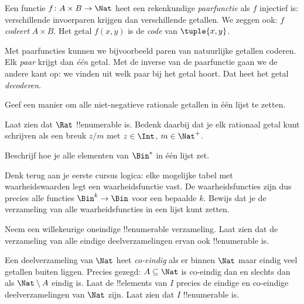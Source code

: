 \documentclass[openany]{memoir}
\begin{document}
\begin{defn}[Paarfunctie]
  Een functie $f\colon A \times B \to \Nat$ heet een rekenkundige
  \emph{paarfunctie} als $f$ injectief is: verschillende invoerparen
  krijgen dan verschillende getallen. We zeggen ook: $f$
  \emph{codeert} $A \times B$. Het getal $f(x,y)$ is de
  \emph{code} van $\tuple{x,y}$.
\end{defn}

\begin{explain}
Met paarfuncties kunnen we bijvoorbeeld paren van natuurlijke getallen
coderen. Elk \emph{paar} krijgt dan \emph{één} getal. Met de
inverse van de paarfunctie gaan we de andere kant op: we vinden uit welk
paar bij het getal hoort. Dat heet het getal \emph{decoderen}.
\end{explain}

\begin{prob}
Geef een manier om alle niet-negatieve rationale getallen in één lijst
te zetten.
\end{prob}

\begin{prob}
Laat zien dat $\Rat$ !!{enumerable} is. Bedenk daarbij dat je elk
rationaal getal kunt schrijven als een breuk $z/m$ met $z \in \Int$,
$m \in \Nat^+$.
\end{prob}

\begin{prob}
Beschrijf hoe je alle elementen van $\Bin^*$ in één lijst zet.
\end{prob}

\begin{prob}
Denk terug aan je eerste cursus logica: elke mogelijke tabel met
waarheidswaarden legt een waarheidsfunctie vast. De waarheidsfuncties
zijn dus precies alle functies $\Bin^k \to \Bin$ voor een bepaalde
$k$. Bewijs dat je de verzameling van alle waarheidsfuncties in een
lijst kunt zetten.
\end{prob}

\begin{prob}
Neem een willekeurige oneindige !!{enumerable} verzameling. Laat zien
dat de verzameling van alle eindige deelverzamelingen ervan ook
!!{enumerable} is.
\end{prob}

\begin{prob}
Een deelverzameling van $\Nat$ heet \emph{co-eindig} als er binnen $\Nat$ maar
eindig veel getallen buiten liggen. Precies gezegd: $A \subseteq \Nat$
is co-eindig dan en slechts dan als $\Nat\setminus A$
eindig is. Laat de !!{element}s van $I$ precies de eindige en co-eindige
deelverzamelingen van $\Nat$ zijn. Laat zien dat $I$ !!{enumerable} is.
\end{prob}
\end{document}
